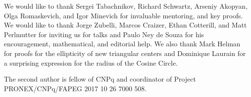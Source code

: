 \begin{acknowledgements}
We would like to thank Sergei Tabachnikov, Richard Schwartz, Arseniy Akopyan, Olga Romaskevich, and Igor Minevich for invaluable mentoring, and key proofs. We would like to thank Jorge Zubelli, Marcos Craizer, Ethan Cotterill, and Matt Perlmutter for inviting us for talks and Paulo Ney de Souza for his encouragement, mathematical, and editorial help. We also thank Mark Helman for proofs for the ellipticity of new triangular centers and Dominique Laurain for a surprising expression for the radius of the Cosine Circle.

The second author is fellow of CNPq and coordinator of Project PRONEX/CNPq/FAPEG 2017 10    26 7000 508.
\end{acknowledgements}